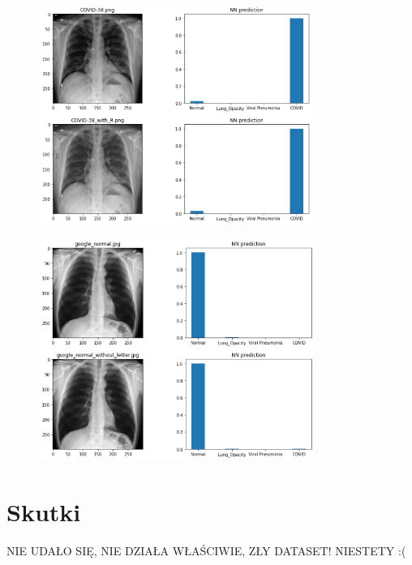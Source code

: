 \documentclass{article}
\begin{document}
\begin{figure}[H]
	\centering
	\includegraphics[width=0.8\textwidth,keepaspectratio=true]{covid_R_exp}
	\caption{}
	\label{}
\end{figure}

\begin{figure}[H]
	\centering
	\includegraphics[width=0.8\textwidth,keepaspectratio=true]{google_normal_L_exp}
	\caption{}
	\label{}
\end{figure}



\section{Skutki}
NIE UDAŁO SIĘ, NIE DZIAŁA WŁAŚCIWIE, ZŁY DATASET! NIESTETY :(


	
\end{document}

